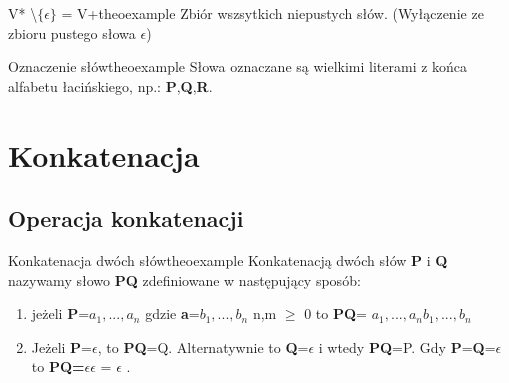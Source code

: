 		\begin{mytheo}{V* \textbackslash $ \{ \epsilon \}$ = V+}{theoexample}
			Zbiór wszsytkich niepustych słów. (Wyłączenie ze zbioru pustego słowa $\epsilon$)
		\end{mytheo}
		
		
		\begin{mytheo}{Oznaczenie słów}{theoexample}
			Słowa oznaczane są wielkimi literami z końca alfabetu łacińskiego, \newline
			np.: { \bf P},{\bf Q},{\bf R}. 
		\end{mytheo}
		

\newpage
\section{Konkatenacja}
	\subsection{Operacja konkatenacji}
	
		\begin{mytheo}{Konkatenacja dwóch słów}{theoexample}
			Konkatenacją dwóch słów {\bf P} i {\bf Q} nazywamy słowo {\bf PQ} 
			zdefiniowane w następujący sposób:
			
			\begin{enumerate}[label=(\roman*)]
				  \item jeżeli {\bf P}=$a_{1}, ... ,a_{n}$ gdzie 
				  {\bf a}=$b_{1}, ... ,b_{n}$ n,m $\ge$ 0 to 
				  {\bf PQ}= $a_{1},...,a_{n}b_{1},...,b_{n}$
				  
				  \item Jeżeli {\bf P}=$\epsilon$, to {\bf PQ}=Q.\newline 
				  Alternatywnie to {\bf Q}=$\epsilon$ i wtedy {\bf PQ}=P. \newline
				  Gdy {\bf P}={\bf Q}=$\epsilon$ to {\bf PQ=}$\epsilon\epsilon$ = $\epsilon$ . 
			\end{enumerate}

		\end{mytheo}

	
	
